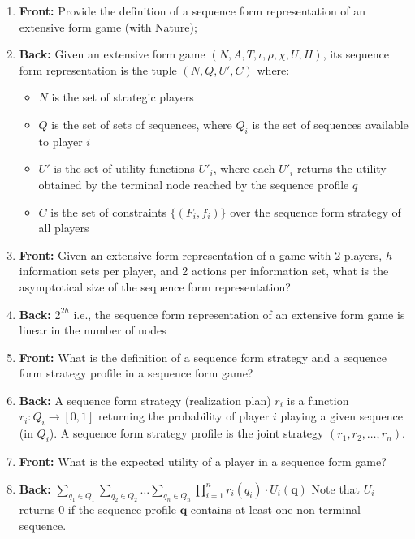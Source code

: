 \documentclass{article}
\begin{document}
\begin{enumerate}
    \newpage\item \textbf{Front:} Provide the definition of a sequence form representation of an extensive form game (with Nature);
    \newpage\item \textbf{Back:} Given an extensive form game $(N, A, T, \iota, \rho, \chi, U, H)$, its sequence form representation is the tuple $(N, Q, U', C)$ where:
    \begin{itemize}
        \item $N$ is the set of strategic players
        \item $Q$ is the set of sets of sequences, where $Q_i$ is the set of sequences available to player $i$
        \item $U'$ is the set of utility functions $U'_i$, where each $U'_i$ returns the utility obtained by the terminal node reached by the sequence profile $q$
        \item $C$ is the set of constraints $\{(F_i, f_i)\}$ over the sequence form strategy of all players
    \end{itemize}
    
    \newpage\item \textbf{Front:} Given an extensive form representation of a game with 2 players, $h$ information sets per player, and 2 actions per information set, what is the asymptotical size of the sequence form representation?
    \newpage\item \textbf{Back:} $2^{2h}$ i.e., the sequence form representation of an extensive form game is linear in the number of nodes
    
    \newpage\item \textbf{Front:} What is the definition of a sequence form strategy and a sequence form strategy profile in a sequence form game?
    \newpage\item \textbf{Back:} A sequence form strategy (realization plan) $r_i$ is a function $r_i: Q_i \rightarrow [0,1]$ returning the probability of player $i$ playing a given sequence (in $Q_i$).\newline
    A sequence form strategy profile is the joint strategy $(r_1, r_2, \ldots, r_n)$.
    
    \newpage\item \textbf{Front:} What is the expected utility of a player in a sequence form game?
    \newpage\item \textbf{Back:} $\sum_{q_1 \in Q_1} \sum_{q_2 \in Q_2} \ldots \sum_{q_n \in Q_n} \prod_{i = 1}^{n} r_i(q_i) \cdot U_i(\mathbf{q})$\newline
    Note that $U_i$ returns 0 if the sequence profile $\mathbf{q}$ contains at least one non-terminal sequence.


\end{enumerate}
\end{document}
